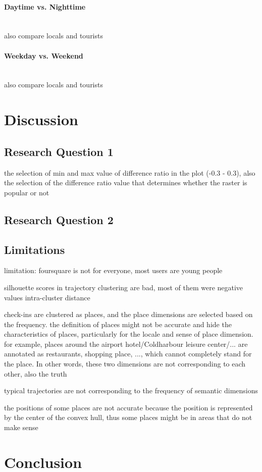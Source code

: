 \documentclass{article}
\newcommand{\subsubsubsection}[1]{\paragraph{#1}\mbox{}\\}
\theoremstyle{definition}
\theoremstyle{remark}
\begin{document}
\subsubsubsection{Daytime vs. Nighttime}
also compare locals and tourists

\subsubsubsection{Weekday vs. Weekend}
also compare locals and tourists


\clearpage


\section{Discussion}
\subsection{Research Question 1}
the selection of min and max value of difference ratio in the plot (-0.3 - 0.3), also the selection of the difference ratio value that determines whether the raster is popular or not

\subsection{Research Question 2}

\subsection{Limitations}
limitation: foursquare is not for everyone, most users are young people

silhouette scores in trajectory clustering are bad, most of them were negative values
intra-cluster distance

check-ins are clustered as places, and the place dimensions are selected based on the frequency. the definition of places might not be accurate and hide the characteristics of places, particularly for the locale and sense of place dimension. for example, places around the airport hotel/Coldharbour leisure center/... are annotated as restaurants, shopping place, ..., which cannot completely stand for the place. In other words, these two dimensions are not corresponding to each other, also the truth

typical trajectories are not corresponding to the frequency of semantic dimensions

the positions of some places are not accurate because the position is represented by the center of the convex hull, thus some places might be in areas that do not make sense
\clearpage


\section{Conclusion}
\end{document}
